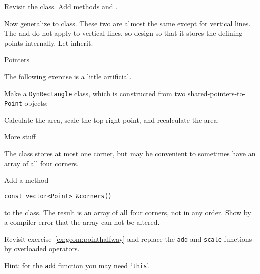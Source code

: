 \begin{exercise}
  \label{ex:geom:line3}
  Revisit the  class.
  Add methods  and .

  Now generalize  to 
  class. These two are almost the same except for vertical lines.
  The  and  do not apply to vertical lines, so
  design  so that it stores the defining points
  internally. Let  inherit.
\end{exercise}

 {Pointers}


The following exercise is a little artificial.

\begin{exercise}
  \label{ex:dynrect}
  Make a \lstinline{DynRectangle} class, which is constructed
  from two shared-pointers-to-\lstinline{Point} objects:

  Calculate the area, scale the top-right point, and recalculate the area:
\end{exercise}

 {More stuff}


The  class stores at most one corner, but may be
convenient to sometimes have an array of all four corners.

\begin{exercise}
  \label{ex:geom:corners}
  Add a method
\begin{lstlisting}
const vector<Point> &corners()
\end{lstlisting}
to the  class. The result is an array of all four
corners, not in any order. Show by a compiler error that the array can
not be altered.
\end{exercise}


\begin{exercise}
  \label{ex:geom:halfwayop}
  Revisit exercise~\ref{ex:geom:pointhalfway}
  and replace the \lstinline{add} and \lstinline{scale} functions
  by overloaded operators.

  Hint: for the \lstinline{add} function you may need `\lstinline{this}'.
\end{exercise}
